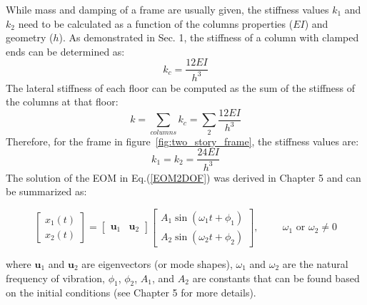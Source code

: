 \documentclass[12pt,letter]{article}
\begin{document}
		
While mass and damping of a frame are usually given, the stiffness values $k_1$ and $k_2$ need to be calculated as a function of the columns properties ($EI$) and geometry ($h$). As demonstrated in Sec. 1, the stiffness of a column with clamped ends can be determined as:
\begin{equation}
k_c = \frac{12EI}{h^3}
\end{equation}
The lateral stiffness of each floor can be computed as the sum of the stiffness of the columns at that floor:
\begin{equation}
k = \sum_{columns}^{} k_c = \sum_{2}^{} \frac{12EI} {h^3}
\end{equation}
Therefore, for the frame in figure~\ref{fig:two_story_frame}, the stiffness values are:
\begin{equation}
k_1 = k_2 = \frac{24EI}{h^3}
\end{equation}
The solution of the EOM in Eq.(\ref{EOM2DOF}) was derived in Chapter 5 and can be summarized as:

\begin{equation}
\begin{bmatrix} x_1(t) \\  x_2(t) \end{bmatrix} =  \begin{bmatrix} \mathbf{u}_1 & \mathbf{u}_2 \end{bmatrix}
\begin{bmatrix} A_1 \sin (\omega_1 t + \phi_1 )\\ A_2 \sin (\omega_2 t + \phi_2 )\end{bmatrix}, \hspace{1cm} \omega_1 \text{ or } \omega_2 \neq 0
\end{equation}

\noindent where $\mathbf{u}_1$ and  $\mathbf{u}_2$ are eigenvectors (or mode shapes), $\omega_1$ and $\omega_2$ are the natural frequency of vibration, 
$\phi_1$, $\phi_2$, $A_1$, and $A_2$ are constants that can be found based on the initial conditions (see Chapter 5 for more details).



		
\pagebreak
\end{document}
